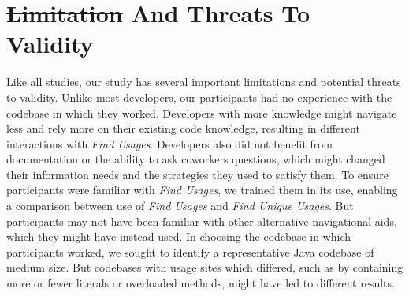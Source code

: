 \documentclass[conference]{IEEEtran}
\providecommand{\DIFadd}[1]{{\protect\color{blue}\uwave{#1}}} %
\providecommand{\DIFdel}[1]{{\protect\color{red}\sout{#1}}}                      %
\providecommand{\DIFaddbegin}{} %
\providecommand{\DIFaddend}{} %
\providecommand{\DIFdelbegin}{} %
\providecommand{\DIFdelend}{} %
\newcommand{\DIFscaledelfig}{0.5}
\newlength{\DIFdelgraphicswidth} %
\newlength{\DIFdelgraphicsheight} %
\newcommand{\DIFaddincludegraphics}[2][]{{\color{blue}\fbox{\DIFOincludegraphics[#1]{#2}}}} %
\newcommand{\DIFdelincludegraphics}[2][]{%
\sbox{\DIFdelgraphicsbox}{\DIFOincludegraphics[#1]{#2}}%
\settoboxwidth{\DIFdelgraphicswidth}{\DIFdelgraphicsbox} %
\settoboxtotalheight{\DIFdelgraphicsheight}{\DIFdelgraphicsbox} %
\scalebox{\DIFscaledelfig}{%
\parbox[b]{\DIFdelgraphicswidth}{\usebox{\DIFdelgraphicsbox}\\[-\baselineskip] \rule{\DIFdelgraphicswidth}{0em}}\llap{\resizebox{\DIFdelgraphicswidth}{\DIFdelgraphicsheight}{%
\setlength{\unitlength}{\DIFdelgraphicswidth}%
\begin{picture}(1,1)%
\thicklines\linethickness{2pt} %
{\color[rgb]{1,0,0}\put(0,0){\framebox(1,1){}}}%
{\color[rgb]{1,0,0}\put(0,0){\line( 1,1){1}}}%
{\color[rgb]{1,0,0}\put(0,1){\line(1,-1){1}}}%
\end{picture}%
}\hspace*{3pt}}} %
} %
\DeclareRobustCommand{\DIFaddbegin}{\DIFOaddbegin \let\includegraphics\DIFaddincludegraphics} %
\DeclareRobustCommand{\DIFaddend}{\DIFOaddend \let\includegraphics\DIFOincludegraphics} %
\DeclareRobustCommand{\DIFdelbegin}{\DIFOdelbegin \let\includegraphics\DIFdelincludegraphics} %
\DeclareRobustCommand{\DIFdelend}{\DIFOaddend \let\includegraphics\DIFOincludegraphics} %
\begin{document}


\section{\DIFdelbegin \DIFdel{Limitation }\DIFdelend \DIFaddbegin \DIFadd{Limitations }\DIFaddend And Threats To Validity}
Like all studies, our study has several important limitations and potential threats to validity. 
Unlike most developers, our participants had no experience with the codebase in which they worked. Developers with more knowledge might navigate less and rely more on their existing code knowledge, resulting in different interactions with \textit{Find Usages}. 
Developers also did not benefit from documentation or the ability to ask coworkers questions, which might \DIFaddbegin \DIFadd{have }\DIFaddend changed their information needs and the strategies they used to satisfy them. 
To ensure participants were familiar with \textit{Find Usages}, we trained them in its use, enabling a comparison between use of \textit{Find Usages} and \textit{Find Unique Usages}. But participants may not have been familiar with other alternative navigational aids, which they might have instead used. In choosing the codebase in which participants worked, we sought to identify a representative Java codebase of medium size. But codebases with usage sites which differed, such as by containing more or fewer literals or overloaded methods, might have led to different results.



\end{document}
